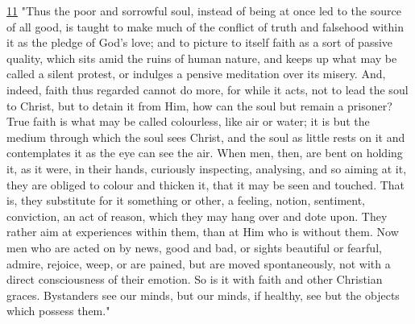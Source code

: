 \documentclass[
]{book}
\begin{document}
\protect\hyperlink{sdfootnote11anc}{11} "Thus the poor and sorrowful soul, instead of being at once led to the source of all good, is taught to make much of the conflict of truth and falsehood within it as the pledge of God's love; and to picture to itself faith as a sort of passive quality, which sits amid the ruins of human nature, and keeps up what may be called a silent protest, or indulges a pensive meditation over its misery. And, indeed, faith thus regarded cannot do more, for while it acts, not to lead the soul to Christ, but to detain it from Him, how can the soul but remain a prisoner? True faith is what may be called colourless, like air or water; it is but the medium through which the soul sees Christ, and the soul as little rests on it and contemplates it as the eye can see the air. When men, then, are bent on holding it, as it were, in their hands, curiously inspecting, analysing, and so aiming at it, they are obliged to colour and thicken it, that it may be seen and touched. That is, they substitute for it something or other, a feeling, notion, sentiment, conviction, an act of reason, which they may hang over and dote upon. They rather aim at experiences within them, than at Him who is without them. Now men who are acted on by news, good and bad, or sights beautiful or fearful, admire, rejoice, weep, or are pained, but are moved spontaneously, not with a direct consciousness of their emotion. So is it with faith and other Christian graces. Bystanders see our minds, but our minds, if healthy, see but the objects which possess them."
\end{document}
